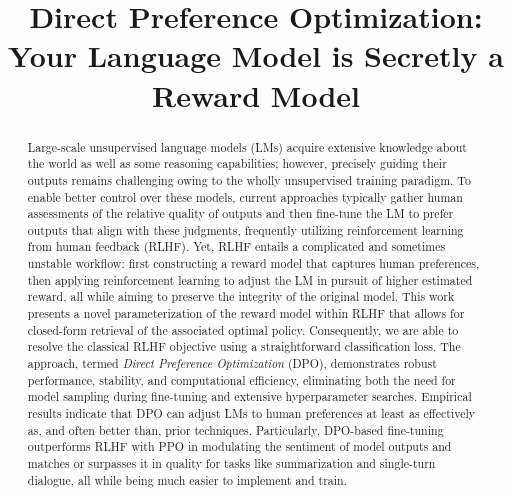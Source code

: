 \title{Direct Preference Optimization: Your Language Model is Secretly a Reward Model}

\begin{abstract}
Large-scale unsupervised language models (LMs) acquire extensive knowledge about the world as well as some reasoning capabilities; however, precisely guiding their outputs remains challenging owing to the wholly unsupervised training paradigm. To enable better control over these models, current approaches typically gather human assessments of the relative quality of outputs and then fine-tune the LM to prefer outputs that align with these judgments, frequently utilizing reinforcement learning from human feedback (RLHF). Yet, RLHF entails a complicated and sometimes unstable workflow: first constructing a reward model that captures human preferences, then applying reinforcement learning to adjust the LM in pursuit of higher estimated reward, all while aiming to preserve the integrity of the original model. This work presents a novel parameterization of the reward model within RLHF that allows for closed-form retrieval of the associated optimal policy. Consequently, we are able to resolve the classical RLHF objective using a straightforward classification loss. The approach, termed \textit{Direct Preference Optimization} (DPO), demonstrates robust performance, stability, and computational efficiency, eliminating both the need for model sampling during fine-tuning and extensive hyperparameter searches. Empirical results indicate that DPO can adjust LMs to human preferences at least as effectively as, and often better than, prior techniques. Particularly, DPO-based fine-tuning outperforms RLHF with PPO in modulating the sentiment of model outputs and matches or surpasses it in quality for tasks like summarization and single-turn dialogue, all while being much easier to implement and train.
\end{abstract}


